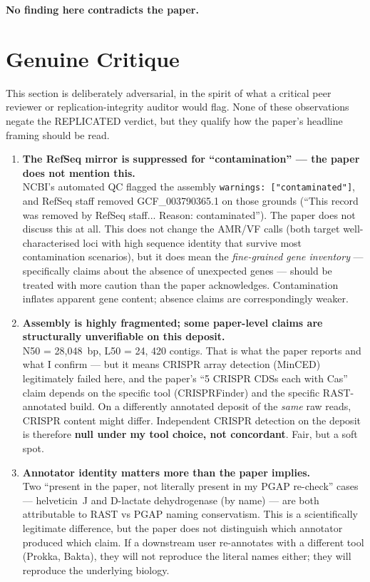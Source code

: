 \documentclass[11pt,letterpaper]{article}
\begin{document}
\textbf{No finding here contradicts the paper.}

\section{Genuine Critique}
This section is deliberately adversarial, in the spirit of what a critical peer reviewer or replication-integrity auditor would flag. None of these observations negate the REPLICATED verdict, but they qualify how the paper's headline framing should be read.

\begin{enumerate}[leftmargin=1.6em]

  \item \textbf{The RefSeq mirror is suppressed for ``contamination'' --- the paper does not mention this.} \\
  NCBI's automated QC flagged the assembly \texttt{warnings: ["contaminated"]}, and RefSeq staff removed GCF\_003790365.1 on those grounds (``This record was removed by RefSeq staff... Reason: contaminated''). The paper does not discuss this at all. This does not change the AMR/VF calls (both target well-characterised loci with high sequence identity that survive most contamination scenarios), but it does mean the \emph{fine-grained gene inventory} --- specifically claims about the absence of unexpected genes --- should be treated with more caution than the paper acknowledges. Contamination inflates apparent gene content; absence claims are correspondingly weaker.

  \item \textbf{Assembly is highly fragmented; some paper-level claims are structurally unverifiable on this deposit.} \\
  N50 = 28{,}048~bp, L50 = 24, 420 contigs. That is what the paper reports and what I confirm --- but it means CRISPR array detection (MinCED) legitimately failed here, and the paper's ``5 CRISPR CDSs each with Cas'' claim depends on the specific tool (CRISPRFinder) and the specific RAST-annotated build. On a differently annotated deposit of the \emph{same} raw reads, CRISPR content might differ. Independent CRISPR detection on the deposit is therefore \textbf{null under my tool choice, not concordant}. Fair, but a soft spot.

  \item \textbf{Annotator identity matters more than the paper implies.} \\
  Two ``present in the paper, not literally present in my PGAP re-check'' cases --- helveticin~J and D-lactate dehydrogenase (by name) --- are both attributable to RAST vs PGAP naming conservatism. This is a scientifically legitimate difference, but the paper does not distinguish which annotator produced which claim. If a downstream user re-annotates with a different tool (Prokka, Bakta), they will not reproduce the literal names either; they will reproduce the underlying biology.


\end{enumerate}
\end{document}
